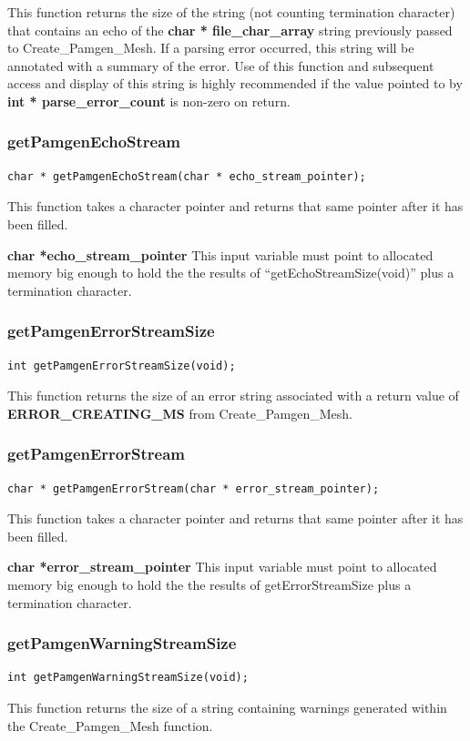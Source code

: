 This function returns the size of the string (not counting termination character) that contains an echo of the \textbf{char * file\_char\_array} string previously passed to Create\_Pamgen\_Mesh. If a parsing error occurred, this string will be annotated with a summary of the error. Use of this function and subsequent access and display of this string is highly recommended if the value pointed to by \textbf{int * parse\_error\_count} is non-zero on return. 

\subsubsection{getPamgenEchoStream}
{\ttfamily  \begin{verbatim}
char * getPamgenEchoStream(char * echo_stream_pointer);
\end{verbatim}}
This function takes a character pointer and returns that same pointer after it has been filled.

{\setlength{\parindent}{0pt}
 \textbf{char *echo\_stream\_pointer} This input variable must point to allocated memory big enough to hold the the results of ``getEchoStreamSize(void)'' plus a termination character.
}

\subsubsection{getPamgenErrorStreamSize}
{\ttfamily  \begin{verbatim}
int getPamgenErrorStreamSize(void);
\end{verbatim}}
This function returns the size of an error string associated with a return value of \textbf{ERROR\_CREATING\_MS} from Create\_Pamgen\_Mesh.


\subsubsection{getPamgenErrorStream}
{\ttfamily  \begin{verbatim}
char * getPamgenErrorStream(char * error_stream_pointer);
\end{verbatim}}
This function takes a character pointer and returns that same pointer after it has been filled.

{\setlength{\parindent}{0pt}
 \textbf{char *error\_stream\_pointer} This input variable must point to allocated memory big enough to hold the the results of getErrorStreamSize plus a termination character.
}


\subsubsection{getPamgenWarningStreamSize}
{\ttfamily  \begin{verbatim}
int getPamgenWarningStreamSize(void);
\end{verbatim}}
This function returns the size of a string containing warnings generated within the Create\_Pamgen\_Mesh function.

